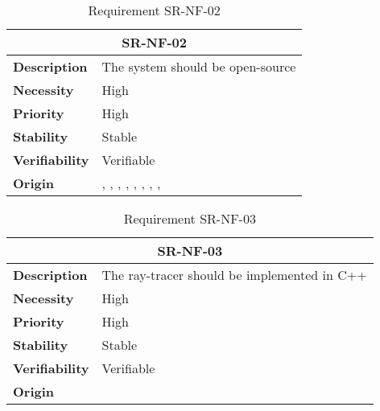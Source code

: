 \begin{table}[H]
    \centering
    \begin{tabular}{l p{10cm}}
        \toprule
        \multicolumn{2}{c}{SR-NF-02} \\
        \toprule
        \textbf{Description}        & The system should be open-source \\
        \textbf{Necessity}          &  High \\
        \textbf{Priority}           &  High \\
        \textbf{Stability}          &  Stable \\
        \textbf{Verifiability}      & Verifiable \\
        \textbf{Origin}             &  \textit{\nameref{tab:ur-re-02}}, \textit{\nameref{tab:ur-ca-03}}, \textit{\nameref{tab:ur-ca-05}}, \textit{\nameref{tab:ur-ca-06}}, \textit{\nameref{tab:ur-ca-07}}, \textit{\nameref{tab:ur-ca-08}}, \textit{\nameref{tab:ur-ca-10}}, \textit{\nameref{tab:ur-ca-12}}, \textit{\nameref{tab:ur-ca-13}} \\
    \end{tabular}
    \caption{Requirement SR-NF-02}
    \label{tab:sr-nf-02}
\end{table}

\begin{table}[H]
    \centering
    \begin{tabular}{l p{10cm}}
        \toprule
        \multicolumn{2}{c}{SR-NF-03} \\
        \toprule
        \textbf{Description}        & The ray-tracer should be implemented in C++ \\
        \textbf{Necessity}          &  High \\
        \textbf{Priority}           &  High \\
        \textbf{Stability}          &  Stable \\
        \textbf{Verifiability}      & Verifiable \\
        \textbf{Origin}             &  \textit{\nameref{tab:ur-re-01}} \\
    \end{tabular}
    \caption{Requirement SR-NF-03}
    \label{tab:sr-nf-03}
\end{table}

